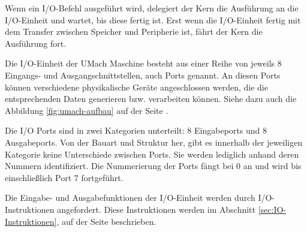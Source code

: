 Wenn ein I/O-Befehl ausgeführt wird, delegiert der Kern die Ausführung an die
I/O-Einheit und wartet, bis diese fertig ist. Erst wenn die I/O-Einheit fertig
mit dem Transfer zwischen Speicher und Peripherie ist, fährt der Kern die
Ausführung fort.


Die I/O-Einheit der UMach Maschine besteht aus einer Reihe von jeweils 8
Eingangs- und Ausgangschnittstellen, auch Ports
genannt. An diesen Ports können verschiedene physikalische Geräte angeschlossen
werden, die die entsprechenden Daten generieren bzw. verarbeiten können. Siehe
dazu auch die Abbildung \ref{fig:umach-aufbau} auf der Seite
\pageref{fig:umach-aufbau}.


Die I/O Ports sind in zwei Kategorien unterteilt: 8 Eingabeports und 8
Ausgabeports. Von der Bauart und Struktur her, gibt es innerhalb der jeweiligen
Kategorie keine Unterschiede zwischen Ports. Sie werden lediglich anhand deren
Nummern identifiziert. Die Nummerierung der Ports fängt bei 0 an und wird bis
einschließlich Port 7 fortgeführt. 


Die Eingabe- und Ausgabefunktionen der I/O-Einheit werden durch
I/O-Instruktionen angefordert. Diese Instruktionen werden im Abschnitt
\ref{sec:IO-Instruktionen}, auf der Seite \pageref{sec:IO-Instruktionen}
beschrieben.
